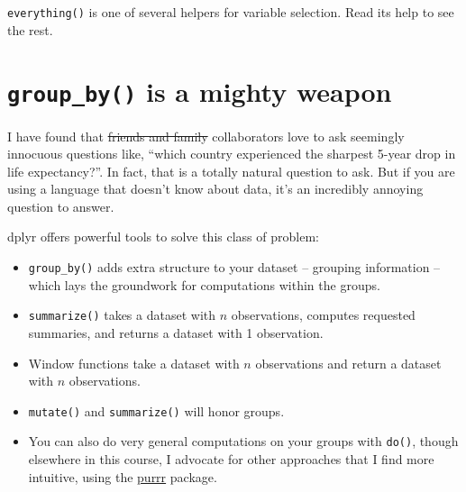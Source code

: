 \documentclass[
]{book}
\newenvironment{Shaded}{\begin{snugshade}}{\end{snugshade}}
\newcommand{\CommentTok}[1]{\textcolor[rgb]{0.56,0.35,0.01}{\textit{#1}}}
\newcommand{\DataTypeTok}[1]{\textcolor[rgb]{0.13,0.29,0.53}{#1}}
\newcommand{\DecValTok}[1]{\textcolor[rgb]{0.00,0.00,0.81}{#1}}
\newcommand{\KeywordTok}[1]{\textcolor[rgb]{0.13,0.29,0.53}{\textbf{#1}}}
\newcommand{\NormalTok}[1]{#1}
\newcommand{\OperatorTok}[1]{\textcolor[rgb]{0.81,0.36,0.00}{\textbf{#1}}}
\newcommand{\StringTok}[1]{\textcolor[rgb]{0.31,0.60,0.02}{#1}}
\begin{document}
\begin{Shaded}
\end{Shaded}

\texttt{everything()} is one of several helpers for variable selection. Read its help to see the rest.

\hypertarget{group_by-is-a-mighty-weapon}{%
\section{\texorpdfstring{\texttt{group\_by()} is a mighty weapon}{group\_by() is a mighty weapon}}\label{group_by-is-a-mighty-weapon}}

I have found that \sout{friends and family} collaborators love to ask seemingly innocuous questions like, ``which country experienced the sharpest 5-year drop in life expectancy?''. In fact, that is a totally natural question to ask. But if you are using a language that doesn't know about data, it's an incredibly annoying question to answer.

dplyr offers powerful tools to solve this class of problem:

\begin{itemize}
\item
  \texttt{group\_by()} adds extra structure to your dataset -- grouping information -- which lays the groundwork for computations within the groups.
\item
  \texttt{summarize()} takes a dataset with \(n\) observations, computes requested summaries, and returns a dataset with 1 observation.
\item
  Window functions take a dataset with \(n\) observations and return a dataset with \(n\) observations.
\item
  \texttt{mutate()} and \texttt{summarize()} will honor groups.
\item
  You can also do very general computations on your groups with \texttt{do()}, though elsewhere in this course, I advocate for other approaches that I find more intuitive, using the \href{https://purrr.tidyverse.org}{purrr} package.
\end{itemize}
\end{document}
